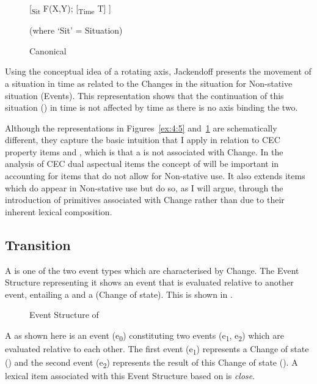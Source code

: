 \begin{figure}\caption{\label{ex:4:6}Canonical  \citep[327]{Jackendoff1996}}
[\textsubscript{Sit} F(X,Y); [\textsubscript{Time} T] ]

(where ‘Sit’ = Situation) 
\end{figure}

Using the conceptual idea of a rotating axis, Jackendoff presents the movement of a situation
in time as related to the Changes in the situation for Non-stative situation (Events).  This
representation shows that the continuation of this situation ()
in time is not affected by time as there is no axis binding the two.

Although the representations in Figures~\ref{ex:4:5} and~\ref{ex:4:6} are
schematically different, they capture the basic intuition that I apply
in relation to CEC property items and , which is
that a  is not associated with Change.  In the analysis of CEC
dual aspectual items the concept of  will be important in
accounting for items that do not allow for Non-stative use.  It also
extends items which do appear in Non-stative use but do so, as I will
argue, through the introduction of primitives associated with Change
rather than due to their inherent lexical composition.

 
\subsection{Transition}\label{sec:4.2.3}

A  is one of the two event types which are characterised by
Change.  The Event Structure representing it shows an event that is
evaluated relative to another event, entailing a  and a 
(Change of state).  This is shown in .

\begin{figure}
\caption{Event Structure of \label{ex:4:7}}
\end{figure}

A  as shown here is an event (e\textsubscript{0})
constituting two events (e\textsubscript{1}, e\textsubscript{2}) which
are evaluated relative to each other.  The first event
(e\textsubscript{1}) represents a Change of state () and the
second event (e\textsubscript{2}) represents the result of this Change
of state ().  A lexical item associated with this Event Structure
based on \citet{Pustejovsky1991} is \textit{close}.

